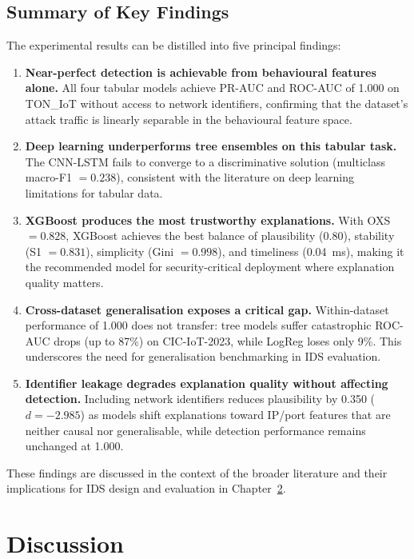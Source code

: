 \documentclass[12pt,a4paper]{report}
\begin{document}
\section{Summary of Key Findings}
\label{sec:results-summary}

The experimental results can be distilled into five principal findings:

\begin{enumerate}
  \item \textbf{Near-perfect detection is achievable from behavioural features alone.} All four tabular models achieve PR-AUC and ROC-AUC of 1.000 on TON\_IoT without access to network identifiers, confirming that the dataset's attack traffic is linearly separable in the behavioural feature space.
  \item \textbf{Deep learning underperforms tree ensembles on this tabular task.} The CNN-LSTM fails to converge to a discriminative solution (multiclass macro-F1 $= 0.238$), consistent with the literature on deep learning limitations for tabular data.
  \item \textbf{XGBoost produces the most trustworthy explanations.} With OXS $= 0.828$, XGBoost achieves the best balance of plausibility (0.80), stability (S1 $= 0.831$), simplicity (Gini $= 0.998$), and timeliness (0.04~ms), making it the recommended model for security-critical deployment where explanation quality matters.
  \item \textbf{Cross-dataset generalisation exposes a critical gap.} Within-dataset performance of 1.000 does not transfer: tree models suffer catastrophic ROC-AUC drops (up to 87\%) on CIC-IoT-2023, while LogReg loses only 9\%. This underscores the need for generalisation benchmarking in IDS evaluation.
  \item \textbf{Identifier leakage degrades explanation quality without affecting detection.} Including network identifiers reduces plausibility by 0.350 ($d = -2.985$) as models shift explanations toward IP/port features that are neither causal nor generalisable, while detection performance remains unchanged at 1.000.
\end{enumerate}

These findings are discussed in the context of the broader literature and their implications for IDS design and evaluation in Chapter~\ref{ch:discussion}.

\chapter{Discussion}
\label{ch:discussion}
\end{document}
